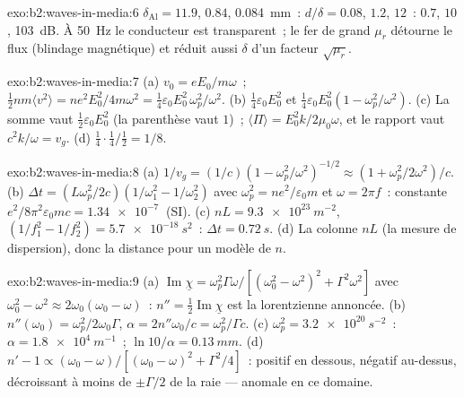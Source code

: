 \begin{solution}{exo:b2:waves-in-media:6}
$\delta_{\text{Al}} = 11.9$, $0.84$, \qty{0.084}{mm}~: $d/\delta = 0.08$, $1.2$, $12$~: $0.7$,
$10$, \qty{103}{dB}. À \qty{50}{Hz} le conducteur est transparent~; le fer de grand
$\mu_r$ détourne le flux (blindage magnétique) et réduit aussi $\delta$ d'un facteur
$\sqrt{\mu_r}$.
\end{solution}

\begin{solution}{exo:b2:waves-in-media:7}
(a) $v_0 = eE_0/m\omega$~; $\tfrac12nm\langle v^2\rangle = ne^2E_0^2/4m\omega^2 = \tfrac14\varepsilon_0
E_0^2\,\omega_p^2/\omega^2$. (b) $\tfrac14\varepsilon_0E_0^2$ et $\tfrac14\varepsilon_0E_0^2(1 - \omega_p^2/
\omega^2)$. (c) La somme vaut $\tfrac12\varepsilon_0E_0^2$ (la parenthèse vaut $1$)~; $\langle\Pi
\rangle = E_0^2k/2\mu_0\omega$, et le rapport vaut $c^2k/\omega = v_g$. (d) $\tfrac14\cdot\tfrac14
/\tfrac12 = 1/8$.
\end{solution}

\begin{solution}{exo:b2:waves-in-media:8}
(a) $1/v_g = (1/c)(1 - \omega_p^2/\omega^2)^{-1/2} \approx (1 + \omega_p^2/2\omega^2)/c$. (b) $\Delta t
= (L\omega_p^2/2c)(1/\omega_1^2 - 1/\omega_2^2)$ avec $\omega_p^2 = ne^2/\varepsilon_0m$ et $\omega =
2\pi f$~: constante $e^2/8\pi^2\varepsilon_0mc = \qty{1.34e-7}{}$ (SI). (c) $nL = \qty{9.3e23}{m^{-2}}$,
$(1/f_1^2 - 1/f_2^2) = \qty{5.7e-18}{s^2}$~: $\Delta t = \qty{0.72}{s}$. (d) La colonne $nL$
(la mesure de dispersion), donc la distance pour un modèle de $n$.
\end{solution}

\begin{solution}{exo:b2:waves-in-media:9}
(a) $\operatorname{Im}\underline\chi = \omega_p^2\Gamma\omega/[(\omega_0^2 - \omega^2)^2 + \Gamma^2\omega^2]$ avec
$\omega_0^2 - \omega^2 \approx 2\omega_0(\omega_0 - \omega)$~: $n'' = \tfrac12\operatorname{Im}\underline\chi$ est
la lorentzienne annoncée. (b) $n''(\omega_0) = \omega_p^2/2\omega_0\Gamma$, $\alpha = 2n''\omega_0/c =
\omega_p^2/\Gamma c$. (c) $\omega_p^2 = \qty{3.2e20}{s^{-2}}$~: $\alpha = \qty{1.8e4}{m^{-1}}$~;
$\ln10/\alpha = \qty{0.13}{mm}$. (d) $n' - 1 \propto (\omega_0 - \omega)/[(\omega_0 - \omega)^2 +
\Gamma^2/4]$~: positif en dessous, négatif au-dessus, décroissant à moins de $\pm\Gamma/2$
de la raie --- anomale en ce domaine.
\end{solution}

